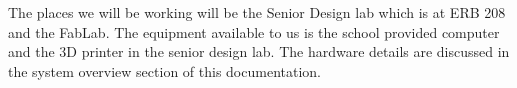 The places we will be working will be the Senior Design lab which is at ERB 208 and the FabLab.
The equipment available to us is the school provided computer and the 3D printer in the senior design lab.
The hardware details are discussed in the system overview section of this documentation. 